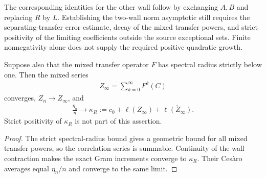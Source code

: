 The corresponding identities for the other wall follow by exchanging
$A,B$ and replacing $R$ by $L$. Establishing the two-wall norm asymptotic
still requires the separating-transfer error estimate, decay of the
mixed transfer powers, and strict positivity of the limiting coefficients
outside the source exceptional sets. Finite nonnegativity alone does not
supply the required positive quadratic growth.

\begin{lemma}
    \label{thm:uncle_wall_gram_linear_limit}
    \leanok
    Suppose also that the mixed transfer operator $F$ has spectral radius
    strictly below one. Then the mixed series
    \begin{align}
        Z_\infty=\sum_{k=0}^{\infty}F^k(C)
    \end{align}
    converges, $Z_n\to Z_\infty$, and
    \begin{align}
        \frac{\eta_n}{n}\longrightarrow
        \kappa_R:=c_0+\ell(Z_\infty)+\overline{\ell(Z_\infty)}.
    \end{align}
    Strict positivity of $\kappa_R$ is not part of this assertion.
\end{lemma}
\begin{proof}
    \leanok
    The strict spectral-radius bound gives a geometric bound for all
    mixed transfer powers, so the correlation series is summable.
    Continuity of the wall contraction makes the exact Gram increments
    converge to $\kappa_R$. Their Ces\`aro averages equal
    $\eta_n/n$ and converge to the same limit.
\end{proof}

